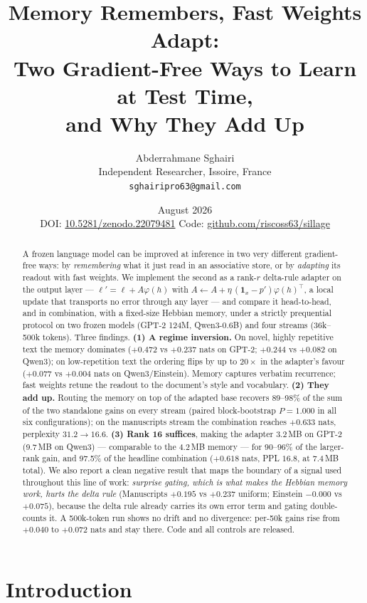 \documentclass[11pt]{article}
\title{\bfseries Memory Remembers, Fast Weights Adapt:\\
Two Gradient-Free Ways to Learn at Test Time,\\
and Why They Add Up}
\author{Abderrahmane Sghairi\\
\small Independent Researcher, Issoire, France\\
\small \texttt{sghairipro63@gmail.com}}
\date{August 2026\\[2pt]
\small DOI: \href{https://doi.org/10.5281/zenodo.22079481}{10.5281/zenodo.22079481}
\qquad Code: \href{https://github.com/riscoss63/sillage}{github.com/riscoss63/sillage}}
\begin{document}
\maketitle

\begin{abstract}
A frozen language model can be improved at inference in two very different gradient-free ways: by \emph{remembering} what it just read in an associative store, or by \emph{adapting} its readout with fast weights. We implement the second as a rank-$r$ delta-rule adapter on the output layer --- $\ell' = \ell + A\varphi(h)$ with $A \leftarrow A + \eta\,(\mathbf{1}_{x} - p')\varphi(h)^{\!\top}$, a local update that transports no error through any layer --- and compare it head-to-head, and in combination, with a fixed-size Hebbian memory, under a strictly prequential protocol on two frozen models (GPT-2 124M, Qwen3-0.6B) and four streams (36k--500k tokens). Three findings. \textbf{(1) A regime inversion.} On novel, highly repetitive text the memory dominates ($+0.472$ vs $+0.237$ nats on GPT-2; $+0.244$ vs $+0.082$ on Qwen3); on low-repetition text the ordering flips by up to $20\times$ in the adapter's favour ($+0.077$ vs $+0.004$ nats on Qwen3/Einstein). Memory captures verbatim recurrence; fast weights retune the readout to the document's style and vocabulary. \textbf{(2) They add up.} Routing the memory on top of the adapted base recovers 89--98\% of the sum of the two standalone gains on every stream (paired block-bootstrap $P = 1.000$ in all six configurations); on the manuscripts stream the combination reaches $+0.633$ nats, perplexity $31.2 \to 16.6$. \textbf{(3) Rank 16 suffices}, making the adapter 3.2\,MB on GPT-2 (9.7\,MB on Qwen3) --- comparable to the 4.2\,MB memory --- for 90--96\% of the larger-rank gain, and 97.5\% of the headline combination ($+0.618$ nats, PPL $16.8$, at 7.4\,MB total). We also report a clean negative result that maps the boundary of a signal used throughout this line of work: \emph{surprise gating, which is what makes the Hebbian memory work, hurts the delta rule} (Manuscripts $+0.195$ vs $+0.237$ uniform; Einstein $-0.000$ vs $+0.075$), because the delta rule already carries its own error term and gating double-counts it. A 500k-token run shows no drift and no divergence: per-50k gains rise from $+0.040$ to $+0.072$ nats and stay there. Code and all controls are released.
\end{abstract}

\section{Introduction}
\end{document}
